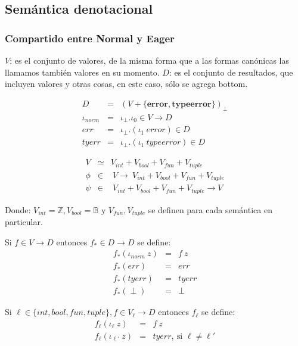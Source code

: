  \subsection{Semántica denotacional}
    \subsubsection{Compartido entre Normal y Eager}
      \PN $V$: es el conjunto de valores, de la misma forma que a las formas canónicas las llamamos también valores en su momento.
      \PN $D$: es el conjunto de resultados, que incluyen valores y otras cosas, en este caso, sólo se agrega bottom.

      \begin{multicols}{2}
        \begin{eqnarray*}
          D &=& (V + \{\textbf{error}, \textbf{typeerror}\})_\bot \\
          \iota_{norm} &=& \iota_{\bot} . \iota_{0} \in V \rightarrow D \\
          err &=& \iota_{\bot} . (\iota_{1} \ error) \in D \\
          tyerr &=& \iota_{\bot} . (\iota_{1} \ typeerror) \in D
        \end{eqnarray*}

        \begin{eqnarray*}
          V &\simeq& V_{int} + V_{bool} + V_{fun} + V_{tuple} \\
          \phi &\in& \ V \rightarrow\ V_{int} + V_{bool} + V_{fun} + V_{tuple} \\
          \psi &\in& \ V_{int} + V_{bool} + V_{fun} + V_{tuple} \rightarrow V
        \end{eqnarray*}
      \end{multicols}

      \PN Donde: $V_{int} = \mathbb{Z}, V_{bool} = \mathbb{B}$ y $V_{fun}, V_{tuple}$ se definen para cada semántica en particular.

      \begin{multicols}{2}
        \PN Si $f\in V\rightarrow D$ entonces $f_{*}\in D\rightarrow D$ se define:
        \begin{eqnarray*}
          f_* (\iota_{norm}\ z) &=& f\ z\\
          f_* (err) &=& err\\
          f_* (tyerr) &=& tyerr\\
          f_* (\perp) &=& \perp
        \end{eqnarray*}
        
        \PN Si $\ell \in \{int, bool, fun, tuple\}, f \in V_{\ell} \rightarrow D$ entonces $f_{\ell}$ se define:
        \begin{eqnarray*}
          f_{\ell} (\iota_{\ell}\ z) &=& f\ z\\
          f_{\ell} (\iota_{\ell'}\ z) &=& tyerr, \ \text{si } \ell \neq \ell'
        \end{eqnarray*}
      \end{multicols}

